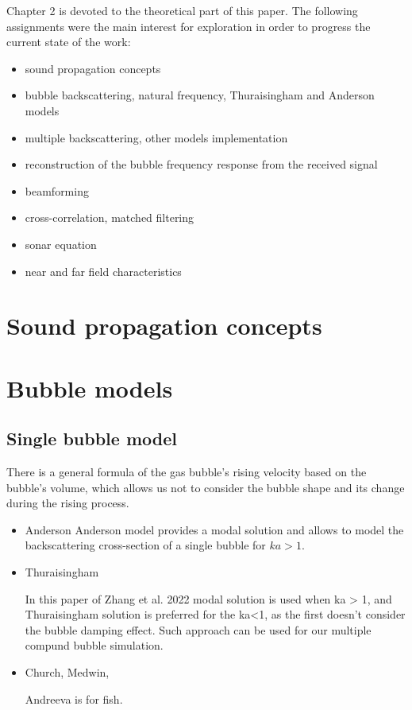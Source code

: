 Chapter 2 is devoted to the theoretical part of this paper. The following assignments were the main interest for exploration in order to progress the current state of the work:
\begin{itemize}
    \item sound propagation concepts
    \item bubble backscattering, natural frequency, Thuraisingham and Anderson models
    \item multiple backscattering, other models implementation
    \item reconstruction of the bubble frequency response from the received signal
    \item beamforming
    \item cross-correlation, matched filtering
    \item sonar equation
    \item near and far field characteristics
\end{itemize}
\section{Sound propagation concepts}

\section{Bubble models}
\subsection{Single bubble model}

There is a general formula of the gas bubble's rising velocity based on the bubble's volume, which allows us not to consider the bubble shape and its change during the rising process.


\begin{itemize}
    \item Anderson
    Anderson model provides a modal solution and allows to model the backscattering cross-section of a single bubble for $ka > 1$\cite{anderson_sound_2005}.

    \item Thuraisingham

    In this paper of Zhang et al. 2022\cite{zhang_efficient_2022} modal solution is used when ka > 1, and Thuraisingham solution is preferred for the ka<1, as the first doesn't consider the bubble damping effect.  Such approach can be used for our multiple compund bubble simulation.

    \item Church, Medwin,

    Andreeva is for fish.

\end{itemize}

